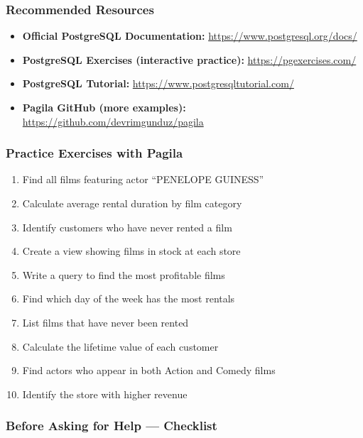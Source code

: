 \documentclass[
  letterpaper,
  DIV=11,
  numbers=noendperiod]{scrartcl}
\providecommand{\tightlist}{%
  \setlength{\itemsep}{0pt}\setlength{\parskip}{0pt}}\usepackage{longtable,booktabs,array}
\begin{document}
\subsubsection{Recommended Resources}\label{recommended-resources}

\begin{itemize}
\tightlist
\item
  \textbf{Official PostgreSQL Documentation:}
  \url{https://www.postgresql.org/docs/}
\item
  \textbf{PostgreSQL Exercises (interactive practice):}
  \url{https://pgexercises.com/}
\item
  \textbf{PostgreSQL Tutorial:}
  \url{https://www.postgresqltutorial.com/}
\item
  \textbf{Pagila GitHub (more examples):}
  \url{https://github.com/devrimgunduz/pagila}
\end{itemize}

\subsubsection{Practice Exercises with
Pagila}\label{practice-exercises-with-pagila}

\begin{enumerate}
\def\labelenumi{\arabic{enumi}.}
\tightlist
\item
  Find all films featuring actor ``PENELOPE GUINESS''
\item
  Calculate average rental duration by film category
\item
  Identify customers who have never rented a film
\item
  Create a view showing films in stock at each store
\item
  Write a query to find the most profitable films
\item
  Find which day of the week has the most rentals
\item
  List films that have never been rented
\item
  Calculate the lifetime value of each customer
\item
  Find actors who appear in both Action and Comedy films
\item
  Identify the store with higher revenue
\end{enumerate}

\subsubsection{Before Asking for Help ---
Checklist}\label{before-asking-for-help-checklist}
\end{document}
